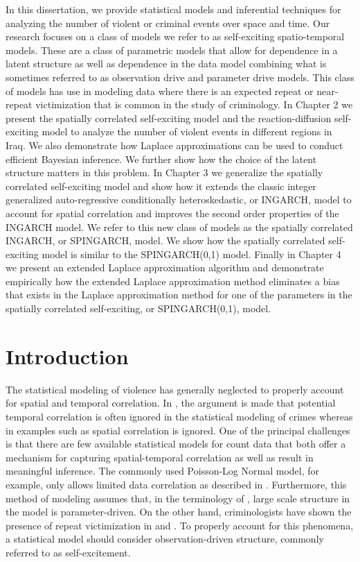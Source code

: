 \documentclass[11pt]{isuthesis}
\begin{document}
In this dissertation, we provide statistical models and inferential techniques for analyzing the number of violent or criminal events over space and time.  Our research focuses on a class of models we refer to as self-exciting spatio-temporal models.  These are a class of parametric models that allow for dependence in a latent structure as well as dependence in the data model combining what is sometimes referred to as observation drive and parameter drive models.  This class of models has use in modeling data where there is an expected repeat or near-repeat victimization that is common in the study of criminology.  In Chapter 2 we present the spatially correlated self-exciting model and the reaction-diffusion self-exciting model to analyze the number of violent events in different regions in Iraq.  We also demonstrate how Laplace approximations can be used to conduct efficient Bayesian inference.  We further show how the choice of the latent structure matters in this problem.  In Chapter 3 we generalize the spatially correlated self-exciting model and show how it extends the classic integer generalized auto-regressive conditionally heteroskedastic, or INGARCH, model to account for spatial correlation and improves the second order properties of the INGARCH model.  We refer to this new class of models as the spatially correlated INGARCH, or SPINGARCH, model.  We show how the spatially correlated self-exciting model is similar to the SPINGARCH(0,1) model.  Finally in Chapter 4 we present an extended Laplace approximation algorithm and demonstrate empirically how the extended Laplace approximation method eliminates a bias that exists in the Laplace approximation method for one of the parameters in the spatially correlated self-exciting, or SPINGARCH(0,1), model. 
\newpage
{}
\chapter{Introduction}
The statistical modeling of violence has generally neglected to properly account for spatial and temporal correlation.  In \cite{ratcliffe2010crime}, the argument is made that potential temporal correlation is often ignored in the statistical modeling of crimes whereas in examples such as \cite{mohler2013modeling} spatial correlation is ignored.  One of the principal challenges is that there are few available statistical models for count data that both offer a mechanism for capturing spatial-temporal correlation as well as result in meaningful inference.  The commonly used Poisson-Log Normal model, for example, only allows limited data correlation as described in \cite{aitchison1989multivariate}.  Furthermore, this method of modeling assumes that, in the terminology of \cite{cox1981statistical}, large scale structure in the model is parameter-driven.  On the other hand, criminologists have shown the presence of repeat victimization in \cite{johnson1997new} and \cite{johnson2007space}.  To properly account for this phenomena, a statistical model should consider observation-driven structure, commonly referred to as self-excitement.
\end{document}

